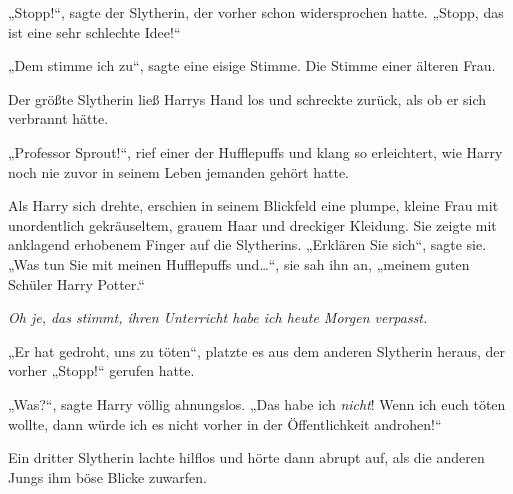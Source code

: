 „Stopp!“, sagte der Slytherin, der vorher schon widersprochen hatte. „Stopp, das ist eine sehr schlechte Idee!“

„Dem stimme ich zu“, sagte eine eisige Stimme. Die Stimme einer älteren Frau.

Der größte Slytherin ließ Harrys Hand los und schreckte zurück, als ob er sich verbrannt hätte.

„Professor Sprout!“, rief einer der Hufflepuffs und klang so erleichtert, wie Harry noch nie zuvor in seinem Leben jemanden gehört hatte.

Als Harry sich drehte, erschien in seinem Blickfeld eine plumpe, kleine Frau mit unordentlich gekräuseltem, grauem Haar und dreckiger Kleidung. Sie zeigte mit anklagend erhobenem Finger auf die Slytherins. „Erklären Sie sich“, sagte sie. „Was tun Sie mit meinen Hufflepuffs und…“, sie sah ihn an, „meinem guten Schüler Harry Potter.“

\emph{Oh je, das stimmt, \emph{ihren} Unterricht habe ich heute Morgen verpasst.}

„Er hat gedroht, uns zu töten“, platzte es aus dem anderen Slytherin heraus, der vorher „Stopp!“ gerufen hatte.

„Was?“, sagte Harry völlig ahnungslos. „Das habe ich \emph{nicht}! Wenn ich euch töten wollte, dann würde ich es nicht vorher in der Öffentlichkeit androhen!“

Ein dritter Slytherin lachte hilflos und hörte dann abrupt auf, als die anderen Jungs ihm böse Blicke zuwarfen.

